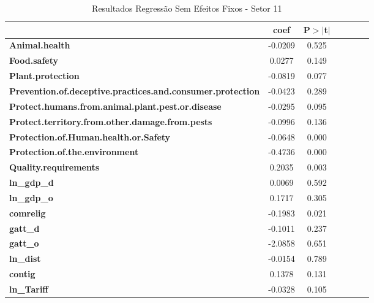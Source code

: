 \begin{table}[ht]
    
    \begin{center}
        \begin{tabular}{lcccccc}
            & \textbf{coef} & \textbf{P$> |$t$|$}\\
            \midrule
\textbf{Animal.health}                                             &      -0.0209 &         0.525 \\
\textbf{Food.safety}                                               &       0.0277 &         0.149 \\
\textbf{Plant.protection}                                          &      -0.0819 &         0.077 \\
\textbf{Prevention.of.deceptive.practices.and.consumer.protection} &      -0.0423 &         0.289 \\
\textbf{Protect.humans.from.animal.plant.pest.or.disease}          &      -0.0295 &         0.095 \\
\textbf{Protect.territory.from.other.damage.from.pests}            &      -0.0996 &         0.136 \\
\textbf{Protection.of.Human.health.or.Safety}                      &      -0.0648 &         0.000 \\
\textbf{Protection.of.the.environment}                             &      -0.4736 &         0.000 \\
\textbf{Quality.requirements}                                      &       0.2035 &         0.003 \\
\textbf{ln\_gdp\_d}                                                &       0.0069 &         0.592 \\
\textbf{ln\_gdp\_o}                                                &       0.1717 &         0.305 \\
\textbf{comrelig}                                                  &      -0.1983 &         0.021 \\
\textbf{gatt\_d}                                                   &      -0.1011 &         0.237 \\
\textbf{gatt\_o}                                                   &      -2.0858 &         0.651 \\
\textbf{ln\_dist}                                                  &      -0.0154 &         0.789 \\
\textbf{contig}                                                    &       0.1378 &         0.131 \\
\textbf{ln\_Tariff}                                                &      -0.0328 &         0.105 \\
\bottomrule
\end{tabular}
\caption{Resultados Regressão Sem Efeitos Fixos - Setor 11}
\end{center}
\end{table}